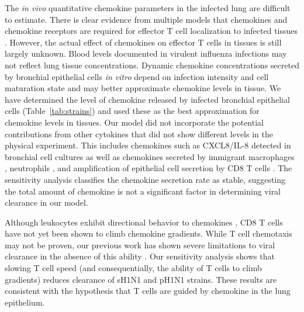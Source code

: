 \documentclass[preprint,10pt,authoryear]{elsarticle}
\begin{document}
The \textit{in vivo} quantitative chemokine parameters in the infected lung are difficult to estimate.  There is clear evidence from multiple models that chemokines and chemokine receptors are required for effector T cell localization to infected tissues \citep{Christensen2004, Christensen2006, Dawson2000, DeLemos2005, Fadel2008, Gadhamsetty2014, Groom2011a, Groom2011, Hsieh2006, Klein2005, Kohlmeier2009, Kohlmeier2011, Thapa2008, Wareing2004, Wuest2008, Pawelek2012}. However, the actual effect of chemokines on effector T cells in tissues is still largely unknown.  Blood levels documented in virulent influenza infections \citep{DeJong2006} may not reflect lung tissue concentrations.  Dynamic chemokine concentrations secreted by bronchial epithelial cells \textit{in vitro} depend on infection intensity and cell maturation state \citep{Mitchell2011, Chan2010, Chan2005, Zeng2011} and may better approximate chemokine levels in tissue.  We have determined the level of chemokine released by infected bronchial epithelial cells (Table~\ref{tab:strains}) and used these as the best approximation for chemokine levels in tissues.  Our model did not incorporate  the potential contributions from other cytokines that did not show different levels in the physical experiment.  This includes chemokines such as CXCL8/IL-8 detected in bronchial cell cultures \citep{Matsukura1996, Arndt2002} as well as chemokines secreted by immigrant macrophages \citep{Julkunen2000}, neutrophils \citep{lim2015neutrophil}, and amplification of epithelial cell secretion by CD8 T cells \citep{Zhao2000}.  The sensitivity analysis classifies the chemokine secretion rate as stable, suggesting the total amount of chemokine is not a significant factor in determining viral clearance in our model.  

Although leukocytes exhibit directional behavior to chemokines \citep{LiJeon2002, McDonald2010}, CD8 T cells have not yet been shown to climb chemokine gradients.   While T cell chemotaxis may not be proven, our previous work has shown severe limitations to viral clearance in the absence of this ability \citep{Banerjee2011}.  Our sensitivity analysis shows that slowing T cell speed (and consequentially, the ability of T cells to climb gradients) reduces clearance of sH1N1 and pH1N1 strains.   These results are consistent with the hypothesis that T cells are guided by chemokine in the lung epithelium.

\end{document}
